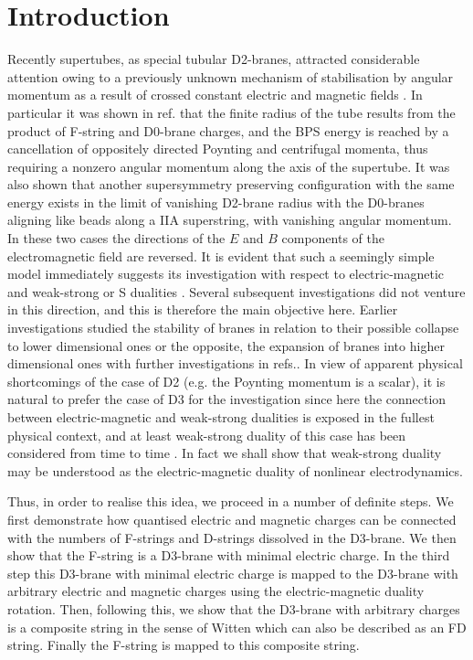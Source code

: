\documentclass[a4paper,12pt]{article}
\begin{document}
\newpage
\section{Introduction}
 
Recently supertubes,  as special tubular D2-branes, 
attracted considerable attention owing to
a previously unknown mechanism of stabilisation by
angular momentum as a result
of crossed constant electric and magnetic fields \cite{1}.
In particular it was shown in ref. \cite{1}
that the finite radius of the
tube results
from the product of F-string and D0-brane charges,
and the BPS energy is reached by a cancellation
of oppositely directed Poynting and centrifugal momenta,
thus requiring a nonzero angular momentum along the axis of the
supertube.
It was also shown that another supersymmetry
preserving configuration with the
same energy exists in the limit of vanishing
D2-brane radius with the D0-branes
aligning like beads along a IIA superstring,
with  vanishing angular momentum.
In these two cases the directions of the
$E$  and $B$  components 
of the electromagnetic field are reversed.
It is evident that such a seemingly simple model
immediately suggests its investigation
with respect to electric-magnetic \cite{2,3,4} 
 and weak-strong or S dualities \cite{5,6}.
Several subsequent investigations \cite{7,8,9} did not venture
in this direction, and this is therefore the main  objective  here.
Earlier  investigations \cite{10,11,12} 
studied the
stability  of branes in relation 
to their possible  collapse  to lower dimensional ones 
\cite{10,11,12} 
or the opposite, the expansion of branes into
higher dimensional ones \cite{9,13,14}
with further investigations in refs.\cite{14,15}.
  In view of
apparent physical shortcomings of the case of D2
 (e.g. the Poynting momentum
is a scalar),  it is natural to prefer the case
of D3 for the investigation since here
the connection between electric-magnetic and 
weak-strong dualities is exposed in the fullest physical
context, and at least weak-strong duality of this case
has been considered from time to time \cite{16}.  In fact we shall
show that weak-strong  duality may be understood
as the electric-magnetic duality of nonlinear 
electrodynamics.

Thus, in order to realise this idea, we proceed
in a number of definite steps. We first
demonstrate how quantised
electric and magnetic charges can be
connected with the numbers of
F-strings and D-strings dissolved in the
D3-brane.  We then show that the F-string is a D3-brane with
minimal electric charge.  In the third step
this D3-brane with minimal electric charge is mapped to the
D3-brane with arbitrary  electric and magnetic charges using
the electric-magnetic duality rotation.
Then, following this, we show that the D3-brane with arbitrary charges
is a composite string in the sense of Witten\cite{17} which can
also be described as an FD string\cite{18}.
Finally the
F-string
is mapped to this composite  string.
\end{document}
